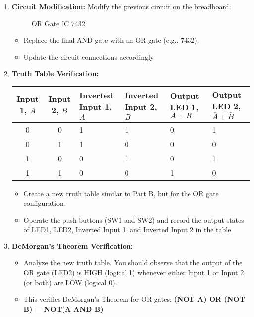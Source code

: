 \begin{enumerate}
    \item \textbf{Circuit Modification:} Modify the previous circuit on the breadboard:
    
    \begin{figure}[H]
        \centering
        
        \caption{OR Gate IC 7432}
        \label{fig:or_ic}
    \end{figure}

     \begin{itemize}
        \item Replace the final AND gate with an OR gate (e.g., 7432).
        \item Update the circuit connections accordingly
    \end{itemize}
    \item \textbf{Truth Table Verification:}

    \renewcommand{\arraystretch}{1.5}
    \begin{table}[H]
        \centering
        \begin{tabular}{c|c|m{2 cm}|m{2 cm}|m{2 cm}|m{2 cm}}
            \hline
            \textbf{Input 1, \( A \)} & \textbf{Input 2, \( B \)} & \textbf{Inverted Input 1, \( \overline{A} \)} & \textbf{Inverted Input 2, \( \overline{B} \)} & \textbf{Output LED 1, \( A + B \)} & \textbf{Output LED 2, \( \overline{A} + \overline{B} \)} \\ \hline
            \hline
            0 & 0 & 1 & 1 & 0 & 1 \\ \hline
            0 & 1 & 1 & 0 & 0 & 0 \\ \hline
            1 & 0 & 0 & 1 & 0 & 1 \\ \hline
            1 & 1 & 0 & 0 & 1 & 0 \\
            \hline
        \end{tabular}
        \label{tab:truth_table}
    \end{table}

    \begin{itemize}
        \item Create a new truth table similar to Part B, but for the OR gate configuration.
        \item Operate the push buttons (SW1 and SW2) and record the output states of LED1, LED2, Inverted Input 1, and Inverted Input 2 in the table.
    \end{itemize}

    \item \textbf{DeMorgan's Theorem Verification:}

    \begin{itemize}
        \item Analyze the new truth table. You should observe that the output of the OR gate (LED2) is HIGH (logical 1) whenever either Input 1 or Input 2 (or both) are LOW (logical 0).
        \item This verifies DeMorgan's Theorem for OR gates: \textbf{(NOT A) OR (NOT B) = NOT(A AND B)}
    \end{itemize}

\end{enumerate}

